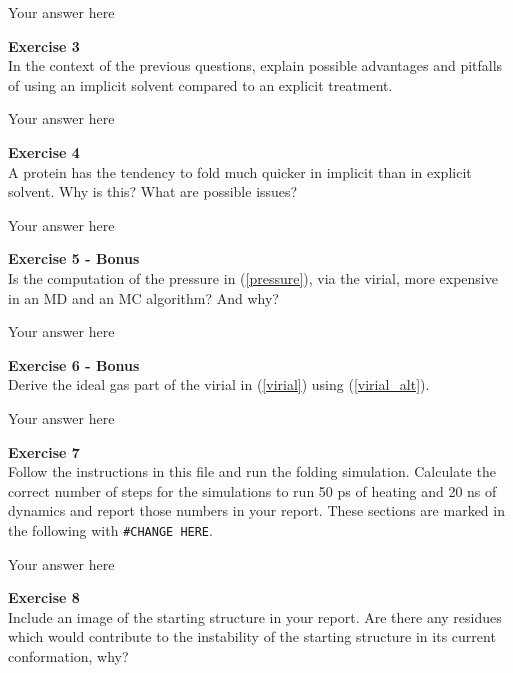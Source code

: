 \documentclass{article}
\begin{document}
Your answer here

\begin{mdframed}
\textbf{Exercise 3}\\
In the context of the previous questions, explain possible advantages and pitfalls of using an implicit solvent compared to an explicit treatment.
\end{mdframed}

Your answer here

\begin{mdframed}
\textbf{Exercise 4}\\
A protein has the tendency to fold much quicker in implicit than in explicit solvent. Why is this? What are possible issues?
\end{mdframed}

Your answer here

\begin{mdframed}
\textbf{Exercise 5 - Bonus}\\
Is the computation of the pressure in
(\ref{pressure}), via the virial, more expensive in an MD and an MC
algorithm? And why?
\end{mdframed}

Your answer here

\begin{mdframed}
\textbf{Exercise 6 - Bonus}\\
Derive the ideal gas part of the virial in (\ref{virial}) using (\ref{virial_alt}).
\end{mdframed}

Your answer here

\begin{mdframed}
\textbf{Exercise 7}\\
Follow the instructions in this file and run the folding simulation.
Calculate the correct number of steps for the simulations to run 50 ps of heating and 20 ns of dynamics and report those numbers in your report. These sections are marked in the following with \texttt{\#CHANGE HERE}.
\end{mdframed}

Your answer here

\begin{mdframed}
\textbf{Exercise 8}\\
Include an image of the starting structure in your report. Are there any residues which  would contribute to the instability of the starting structure in its current conformation, why?
\end{mdframed}
\end{document}
